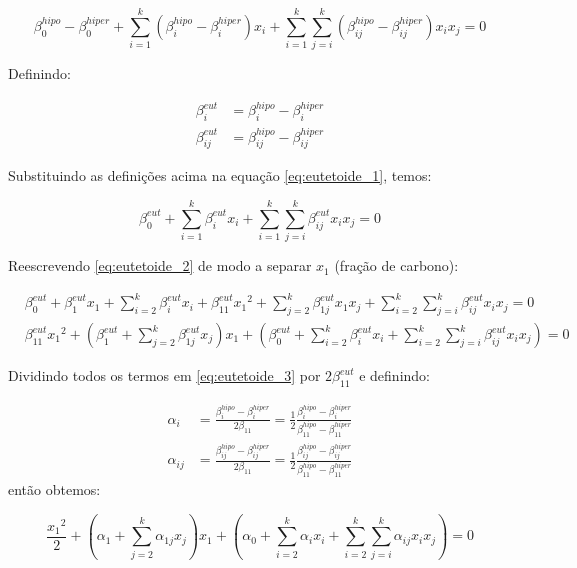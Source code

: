 \documentclass[brazil,tf,epusp]{usp}  %
\begin{document}
\begin{equation}
	\beta_0^{hipo} - \beta_0^{hiper}
	+ \sum_{i=1}^k \left(\beta_i^{hipo} - \beta_i^{hiper}\right) x_i
	+ \sum_{i=1}^{k} \sum_{j=i}^k \left(\beta_{ij}^{hipo} - \beta_{ij}^{hiper}\right) x_i x_j = 0
	\label{eq:eutetoide_1}
\end{equation}

Definindo:

\begin{align}
	\beta_i^{eut} &= \beta_i^{hipo} - \beta_i^{hiper} \\
	\beta_{ij}^{eut} &= \beta_{ij}^{hipo} - \beta_{ij}^{hiper}
\end{align}

Substituindo as definições acima na equação \ref{eq:eutetoide_1}, temos:

\begin{equation}
	\beta_0^{eut} + \sum_{i=1}^k \beta_i^{eut} x_i
	+ \sum_{i=1}^{k} \sum_{j=i}^k \beta_{ij}^{eut} x_i x_j = 0
	\label{eq:eutetoide_2}
\end{equation}

Reescrevendo \ref{eq:eutetoide_2} de modo a separar $x_1$ (fração de carbono):

\begin{align}
	&\beta_0^{eut}
	+ \beta_1^{eut} x_ 1
	+ \sum_{i=2}^k \beta_i^{eut} x_i
	+ \beta_{11}^{eut} {x_1}^2
	+ \sum_{j=2}^k \beta_{1j}^{eut} x_1 x_j
	+ \sum_{i=2}^{k} \sum_{j=i}^k \beta_{ij}^{eut} x_i x_j = 0 \nonumber \\
	&\beta_{11}^{eut} {x_1}^2
	+ \left(\beta_1^{eut} + \sum_{j=2}^k \beta_{1j}^{eut} x_j \right) x_1
	+ \left(\beta_0^{eut}
	+ \sum_{i=2}^k \beta_i^{eut} x_i
	+ \sum_{i=2}^{k} \sum_{j=i}^k \beta_{ij}^{eut} x_i x_j\right) = 0 \label{eq:eutetoide_3}
\end{align}

Dividindo todos os termos em \ref{eq:eutetoide_3} por $2 \beta_{11}^{eut}$ e definindo:

\begin{align}
	\alpha_i
	&= \frac{\beta_i^{hipo} - \beta_i^{hiper}}{2 \beta_{11}}
	= \frac{1}{2} \frac{\beta_i^{hipo} - \beta_i^{hiper}}{\beta_{11}^{hipo} - \beta_{11}^{hiper}}\\
	\alpha_{ij}
	&= \frac{\beta_{ij}^{hipo} - \beta_{ij}^{hiper}}{2 \beta_{11}}
	= \frac{1}{2} \frac{\beta_{ij}^{hipo} - \beta_{ij}^{hiper}}{\beta_{11}^{hipo} - \beta_{11}^{hiper}}
\end{align}
%
então obtemos:

\begin{equation}
	\frac{{x_1}^2}{2}
	+ \left(\alpha_1 + \sum_{j=2}^k \alpha_{1j} x_j \right) x_1
	+ \left(\alpha_0
	+ \sum_{i=2}^k \alpha_i x_i
	+ \sum_{i=2}^{k} \sum_{j=i}^k \alpha_{ij} x_i x_j\right) = 0 \label{eq:eutetoide_4}
\end{equation}
\end{document}
